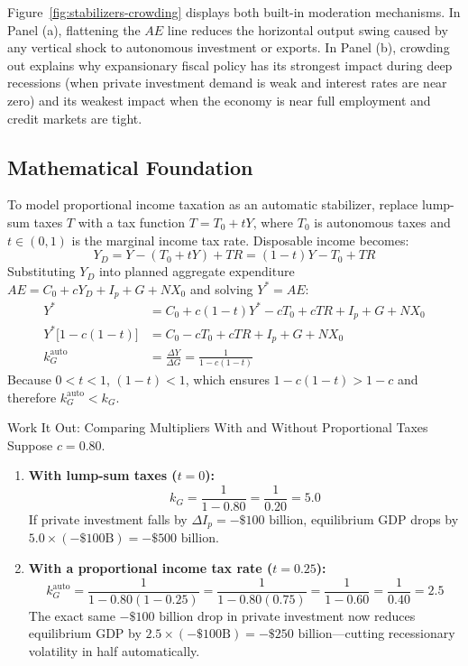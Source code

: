 \documentclass[11pt,letterpaper]{article}
\begin{document}
Figure~\ref{fig:stabilizers-crowding} displays both built-in moderation mechanisms. In Panel (a), flattening the $AE$ line reduces the horizontal output swing caused by any vertical shock to autonomous investment or exports. In Panel (b), crowding out explains why expansionary fiscal policy has its strongest impact during deep recessions (when private investment demand is weak and interest rates are near zero) and its weakest impact when the economy is near full employment and credit markets are tight.

\subsection*{Mathematical Foundation}
To model proportional income taxation as an automatic stabilizer, replace lump-sum taxes $T$ with a tax function $T = T_0 + tY$, where $T_0$ is autonomous taxes and $t \in (0,1)$ is the marginal income tax rate. Disposable income becomes:
\begin{equation}
Y_D = Y - (T_0 + tY) + TR = (1 - t)Y - T_0 + TR
\end{equation}
Substituting $Y_D$ into planned aggregate expenditure $AE = C_0 + cY_D + I_p + G + NX_0$ and solving $Y^* = AE$:
\begin{align}
Y^* &= C_0 + c(1 - t)Y^* - cT_0 + cTR + I_p + G + NX_0 \nonumber \\
Y^*\big[1 - c(1 - t)\big] &= C_0 - cT_0 + cTR + I_p + G + NX_0 \nonumber \\
k_G^{\text{auto}} &= \frac{\Delta Y}{\Delta G} = \frac{1}{1 - c(1 - t)}
\end{align}
Because $0 < t < 1$, $(1 - t) < 1$, which ensures $1 - c(1 - t) > 1 - c$ and therefore $k_G^{\text{auto}} < k_G$.

\begin{examplecase}{Work It Out: Comparing Multipliers With and Without Proportional Taxes}
Suppose $c = 0.80$.
\begin{enumerate}
    \item \textbf{With lump-sum taxes ($t = 0$):}
    \[
    k_G = \frac{1}{1 - 0.80} = \frac{1}{0.20} = 5.0
    \]
    If private investment falls by $\Delta I_p = -\$100\text{ billion}$, equilibrium GDP drops by $5.0 \times (-\$100\text{B}) = -\$500\text{ billion}$.
    \item \textbf{With a proportional income tax rate ($t = 0.25$):}
    \[
    k_G^{\text{auto}} = \frac{1}{1 - 0.80(1 - 0.25)} = \frac{1}{1 - 0.80(0.75)} = \frac{1}{1 - 0.60} = \frac{1}{0.40} = 2.5
    \]
    The exact same $-\$100\text{ billion}$ drop in private investment now reduces equilibrium GDP by $2.5 \times (-\$100\text{B}) = -\$250\text{ billion}$---cutting recessionary volatility in half automatically.
\end{enumerate}
\end{examplecase}
\end{document}
